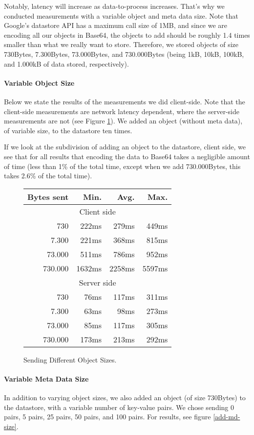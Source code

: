 Notably, latency will increase as data-to-process increases. That's why we
conducted measurements with a variable object and meta data size. Note that
Google's datastore API has a maximum call size of 1MB, and since we are
encoding all our objects in Base64, the objects to add should be roughly 1.4
times smaller than what we really want to store. Therefore, we stored objects 
of size 730Bytes, 7.300Bytes, 73.000Bytes, and 730.000Bytes (being 1kB, 10kB,
100kB, and 1.000kB of data stored, respectively).

\paragraph{Variable Object Size}
Below we state the results of the measurements we did client-side. Note that
the client-side measurements are network latency dependent, where the
server-side measurements are not (see Figure \ref{add-obj-size}). We added an
object (without meta data), of variable size, to the datastore ten times.

If we look at the subdivision of adding an object to the datastore, client
side, we see that for all results that encoding the data to Base64 takes a
negligible amount of time (less than 1\% of the total time, except when we add
730.000Bytes, this takes 2.6\% of the total time). 

\begin{figure}
\begin{tabular}{|r|r|r|r|}
\hline
Bytes sent & Min. & Avg. & Max. \\
\hline
\multicolumn{4}{|c|}{Client side} \\
\hline
730 & 222ms & 279ms & 449ms \\
7.300 & 221ms & 368ms & 815ms \\
73.000 & 511ms & 786ms & 952ms \\ 
730.000 & 1632ms & 2258ms & 5597ms \\
\hline
\multicolumn{4}{|c|}{Server side} \\
\hline
730 & 76ms & 117ms & 311ms \\
7.300 & 63ms & 98ms & 273ms \\
73.000 & 85ms & 117ms & 305ms \\
730.000 & 173ms & 213ms & 292ms \\
\hline
\end{tabular}
\caption{Sending Different Object Sizes. \label{add-obj-size}}
\end{figure}

\paragraph{Variable Meta Data Size}
In addition to varying object sizes, we also added an object (of size 730Bytes)
to the datastore, with a variable number of key-value pairs. We chose sending 0
pairs, 5 pairs, 25 pairs, 50 pairs, and 100 pairs. For results, see figure
\ref{add-md-size}.

